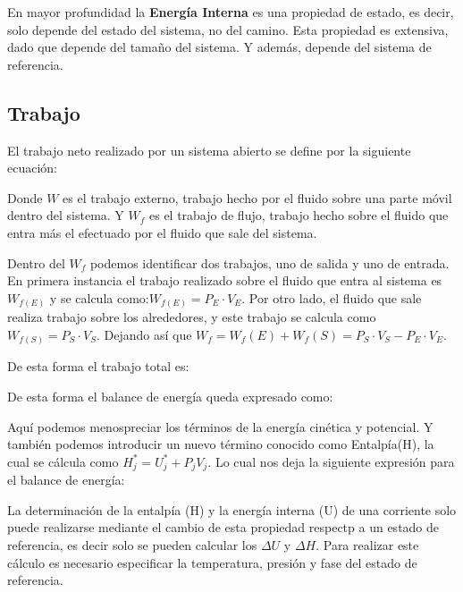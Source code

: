 En mayor profundidad la \textbf{Energía Interna} es una propiedad de estado, es decir, solo depende del estado del sistema, no del camino. Esta propiedad es extensiva, dado que depende del tamaño del sistema. Y además, depende del sistema de referencia.

\subsection{Trabajo}
El trabajo neto realizado por un sistema abierto se define por la siguiente ecuación:

Donde $W$ es el trabajo externo, trabajo hecho por el fluido sobre una parte móvil dentro del sistema. Y $W_f$ es el trabajo de flujo, trabajo hecho sobre el fluido que entra más el efectuado por el fluido que sale del sistema.


Dentro del $W_f$ podemos identificar dos trabajos, uno de salida y uno de entrada. En primera instancia el trabajo realizado sobre el fluido que entra al sistema es $W_{f(E)}$ y se calcula como:$W_{f(E)}=P_E\cdot V_E$. Por otro lado, el fluido que sale realiza trabajo sobre los alrededores,
y este trabajo se calcula como $W_{f(S)}=P_S\cdot V_S$. Dejando así que $W_f=W_{f}(E)+W_{f}(S)=P_S\cdot V_S-P_E\cdot V_E$.

De esta forma el trabajo total es:


De esta forma el balance de energía queda expresado como:


Aquí podemos menospreciar los términos de la energía cinética y potencial. Y también podemos introducir un nuevo término conocido como Entalpía(H), la cual se cálcula como $H_j^*=U_j^*+P_jV_j$.
Lo cual nos deja la siguiente expresión para el balance de energía:


La determinación de la entalpía (H) y la energía interna (U) de una corriente solo puede realizarse mediante el cambio de esta propiedad respectp a un estado de referencia, es decir solo se pueden calcular los $\Delta U$ y $\Delta H$. 
Para realizar este cálculo es necesario especificar la temperatura, presión y fase del estado de referencia.

